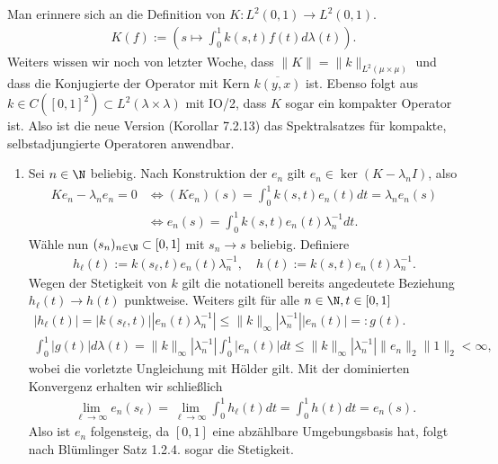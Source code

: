 \begin{solution}

Man erinnere sich an die Definition von $K: L^2(0,1) \to L^2(0,1)$.
\begin{align*}
  K(f) := \left(s \mapsto \int_0^1k(s,t)f(t)d\lambda(t)\right).
\end{align*}
Weiters wissen wir noch von letzter Woche, dass $\|K\| = \|k\|_{L^2(\mu \times \mu)}$ und
dass die Konjugierte der Operator mit Kern $\overline{k(y,x)}$ ist. Ebenso folgt
aus $k \in C([0, 1]^2) \subset L^2(\lambda \times \lambda)$ mit IO/2, dass $K$
sogar ein kompakter Operator ist.
Also ist die neue Version (Korollar 7.2.13) das Spektralsatzes für kompakte,
selbstadjungierte Operatoren anwendbar.
\begin{enumerate}[label = (\alph*)]
  \item Sei $n \in \N$ beliebig. Nach Konstruktion der $e_n$ gilt $e_n \in \ker(K - \lambda_nI)$,
  also
  \begin{align*}
    Ke_n - \lambda_ne_n = 0 &\iff
    (Ke_n)(s) = \int_0^1 k(s,t)e_n(t)dt = \lambda_n e_n(s) \\
    &\iff e_n(s) = \int_0^1 k(s,t)e_n(t)\lambda_n^{-1}dt.
  \end{align*}
  Wähle nun $(s_n)_{n\in\N} \subset [0,1]$ mit $s_n \to s$ beliebig. Definiere
  \begin{align*}
    h_{\ell}(t) := k(s_{\ell},t)e_n(t)\lambda_n^{-1}, \quad
    h(t) := k(s,t)e_n(t)\lambda_n^{-1}.
  \end{align*}
  Wegen der Stetigkeit von $k$ gilt die notationell bereits angedeutete Beziehung
  $h_{\ell}(t) \to h(t)$ punktweise. Weiters gilt für alle $n \in \N, t \in [0,1]$
  \begin{align*}
    |h_{\ell}(t)| = |k(s_{\ell},t)||e_n(t)\lambda_n^{-1}| \leq
    \|k\|_{\infty}|\lambda_n^{-1}||e_n(t)| =: g(t). \\
    \int_0^1|g(t)|d\lambda(t) = \|k\|_{\infty}|\lambda_n^{-1}|\int_0^1|e_n(t)|dt
    \leq \|k\|_{\infty}|\lambda_n^{-1}|\|e_n\|_2\|1\|_2 < \infty,
  \end{align*}
  wobei die vorletzte Ungleichung mit Hölder gilt. Mit der dominierten Konvergenz
  erhalten wir schließlich
  \begin{align*}
    \lim_{\ell \to \infty} e_n(s_{\ell}) = \lim_{\ell \to \infty}\int_0^1h_{\ell}(t)dt
    = \int_0^1h(t)dt = e_n(s).
  \end{align*}
  Also ist $e_n$ folgensteig, da $[0,1]$ eine abzählbare Umgebungsbasis hat,
  folgt nach Blümlinger Satz 1.2.4. sogar die Stetigkeit.

\end{enumerate}
\end{solution}
